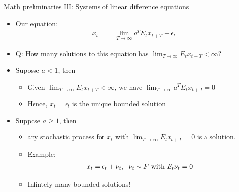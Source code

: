 \documentclass[9pt,xcolor={dvipsnames}]{beamer}
\newcommand{\bit}{\begin{itemize}}
\newcommand{\eit}{\end{itemize}}
\begin{document}
\begin{frame}{Math preliminaries III: Systems of linear difference equations}

\bit
\setlength\itemsep{1.5em}

\item Our equation:
\begin{eqnarray}
x_t &=& \lim_{T \to \infty} a^T E_t  x_{t+T} + \epsilon_t \nonumber
\end{eqnarray}

\item Q: How many solutions to this equation has $\lim_{T \to \infty} E_t  x_{t+T}<\infty$?


\item Suposse $a<1$, then  
\bit
\setlength\itemsep{0.5em}
\item Given $\lim_{T \to \infty} E_t  x_{t+T}<\infty$, we have $\lim_{T \to \infty}  a^T E_t x_{t+T}=0$

\item Hence, $x_t=\epsilon_t$ is the unique bounded solution
\eit


\item Suppose $a\geq1$, then 
\bit
\setlength\itemsep{0.5em}
\item any stochastic process for $x_t$ with $\lim_{T \to \infty} E_t  x_{t+T}=0$ is a solution. 

\item Example:
\begin{eqnarray}
x_t = \epsilon_t + \nu_t, \hspace{2mm} \nu_t \sim F \text{ with } E_t \nu_t = 0 \nonumber
\end{eqnarray}

\item Infintely many bounded solutions!
\eit

\eit

\end{frame}
\end{document}
